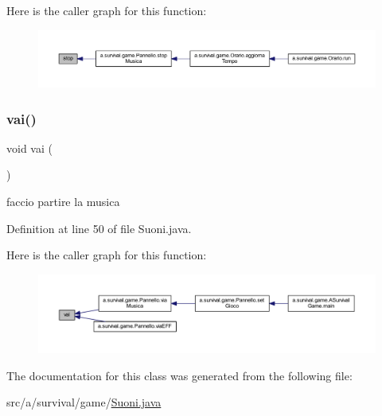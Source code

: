 Here is the caller graph for this function\+:
\nopagebreak
\begin{figure}[H]
\begin{center}
\leavevmode
\includegraphics[width=350pt]{classa_1_1survival_1_1game_1_1_suoni_a8c528baf37154d347366083f0f816846_icgraph}
\end{center}
\end{figure}
\mbox{\label{classa_1_1survival_1_1game_1_1_suoni_ac738b68e43ea05bba3f9e9b8e020426f}} 
\subsubsection{\texorpdfstring{vai()}{vai()}}
{\footnotesize\ttfamily void vai (\begin{DoxyParamCaption}{ }\end{DoxyParamCaption})}



faccio partire la musica 



Definition at line 50 of file Suoni.\+java.

Here is the caller graph for this function\+:
\nopagebreak
\begin{figure}[H]
\begin{center}
\leavevmode
\includegraphics[width=350pt]{classa_1_1survival_1_1game_1_1_suoni_ac738b68e43ea05bba3f9e9b8e020426f_icgraph}
\end{center}
\end{figure}


The documentation for this class was generated from the following file\+:\begin{DoxyCompactItemize}
\item 
src/a/survival/game/\hyperlink{_suoni_8java}{Suoni.\+java}\end{DoxyCompactItemize}
